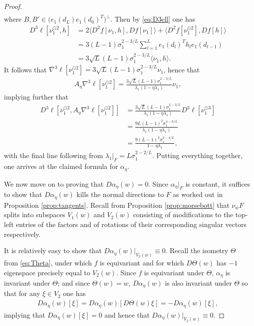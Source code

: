 \documentclass{article}
\theoremstyle{plain}
\theoremstyle{definition}
\theoremstyle{remark}
\begin{document}
\begin{proof}
\begin{align}
    \end{align}
    where $B,B'\in \big(e_1(d_L)e_1(d_0)^T\big)^{\perp}$. Then by \eqref{eq:D3ell} one has
    \begin{align}
    D^3\ell[\nu_1^{\odot 2},h] &= 2\langle D^2f[\nu_1,h],Df[\nu_1]\rangle + \langle D^2f[\nu_1^{\odot 2}],Df[h]\rangle\\&=3(L-1)\sigma_1^{2-3/L}\sum_{l=1}^Le_1(d_l)^Th_le_1(d_{l-1})\\&=3\sqrt{L}(L-1)\sigma_1^{2-3/L}\langle\nu_1,h\rangle.
    \end{align}
    It follows that $\nabla^3\ell[\nu_1^{\odot 2}] = 3\sqrt{L}(L-1)\sigma_1^{2-3/L}\nu_1$, hence that
    \begin{align}
        A_{\eta}\nabla^3\ell[\nu_1^{\odot2}] = \frac{3\sqrt{L}(L-1)\sigma_1^{2-3/L}}{\lambda_1(1-\eta\lambda_1)}\nu_1,
    \end{align}
    implying further that
    \begin{align}
        D^3\ell[\nu_1^{\odot 2},A_{\eta}\nabla^3\ell[\nu_1^{\odot 2}]] &=\frac{3\sqrt{L}(L-1)\sigma_1^{2-3/L}}{\lambda_1(1-\eta\lambda_1)}D^3\ell[\nu_1^{\odot 3}]\\&=\frac{9L(L-1)^2\sigma_1^{4-6/L}}{\lambda_1(1-\eta\lambda_1)}\\&=\frac{9(L-1)^2\sigma_1^{2-4/L}}{1-\eta\lambda_1},
    \end{align}
    with the final line following from $\lambda_1|_{F} = L\sigma_1^{2-2/L}$. Putting everything together, one arrives at the claimed formula for $\alpha_{\eta}$.

    We now move on to proving that $D\alpha_{\eta}(w) = 0$. Since $\alpha_{\eta}|_{F}$ is constant, it suffices to show that $D\alpha_{\eta}(w)$ kills the normal directions to $F$ as worked out in Proposition \ref{prop:tangents}. Recall from Proposition \ref{prop:morsebott} that $\nu_wF$ splits into subspaces $V_1(w)$ and $V_2(w)$ consisting of modifications to the top-left entries of the factors and of rotations of their corresponding singular vectors respectively.
    
    It is relatively easy to show that $D\alpha_{\eta}(w)|_{V_2(w)}\equiv 0$. Recall the isometry $\Theta$ from \eqref{eq:Theta}, under which $f$ is equivariant and for which $D\Theta(w)$ has $-1$ eigenspace precisely equal to $V_2(w)$. Since  $f$ is equivariant under $\Theta$, $\alpha_{\eta}$ is invariant under $\Theta$; and since $\Theta(w) = w$, $D\alpha_{\eta}(w)$ is also invariant under $\Theta$ so that for any $\xi\in V_2$ one has
    \begin{align}
    D\alpha_{\eta}(w)[\xi] = D\alpha_{\eta}(w)[D\Theta(w)\xi] = -D\alpha_{\eta}(w)[\xi],
    \end{align}
    implying that $D\alpha_{\eta}(w)[\xi] = 0$ and hence that $D\alpha_{\eta}(w)|_{V_2(w)}\equiv 0$.


\end{proof}
\end{document}
